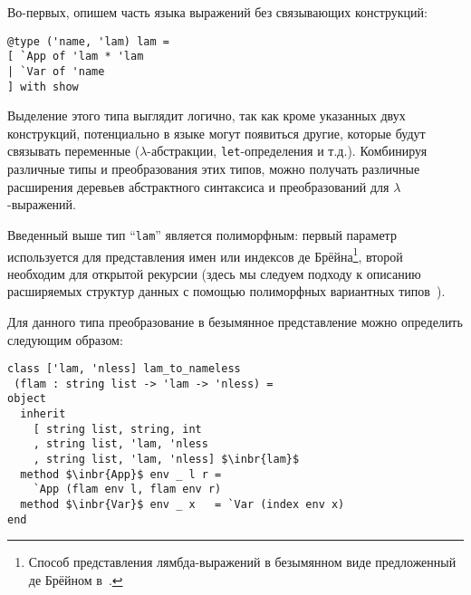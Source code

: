 Во-первых, опишем часть языка выражений без связывающих конструкций:

\begin{lstlisting}
@type ('name, 'lam) lam = 
[ `App of 'lam * 'lam
| `Var of 'name
] with show
\end{lstlisting}

\noindent Выделение этого типа выглядит логично, так как 
кроме указанных двух конструкций, потенциально в языке могут появиться другие, которые будут связывать переменные 
($\lambda$-абстракции, \lstinline{let}-определения и т.д.). Комбинируя различные типы и преобразования этих типов, можно получать различные расширения деревьев абстрактного синтаксиса и преобразований для $\lambda$-выражений.

Введенный выше тип ``\lstinline{lam}'' является полиморфным: первый параметр используется для представления имен или индексов %
де Брёйна\footnote{Способ представления лямбда-выражений в безымянном виде предложенный де Брёйном в~\cite{deBruijn}.}, второй необходим для открытой рекурсии (здесь мы следуем  подходу к описанию расширяемых структур данных с помощью полиморфных 
вариантных типов~\cite{PolyVarReuse}).

Для данного типа преобразование в безымянное представление можно определить следующим образом:

\begin{lstlisting}
class ['lam, 'nless] lam_to_nameless
 (flam : string list -> 'lam -> 'nless) =
object
  inherit 
    [ string list, string, int
    , string list, 'lam, 'nless
    , string list, 'lam, 'nless] $\inbr{lam}$
  method $\inbr{App}$ env _ l r = 
    `App (flam env l, flam env r)
  method $\inbr{Var}$ env _ x   = `Var (index env x)
end
\end{lstlisting}


